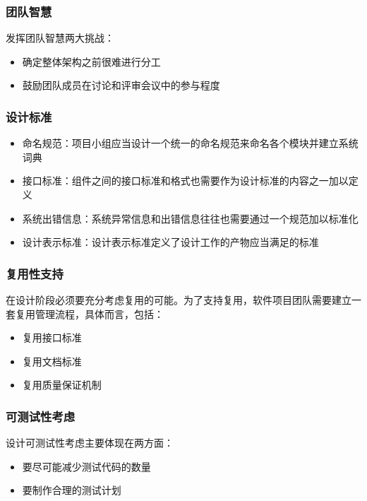 \subsubsection{团队智慧}
发挥团队智慧两大挑战：
\vspace{-0.8em}
\begin{multicols}{2}
    \begin{itemize}
        \item 确定整体架构之前很难进行分工
        \item 鼓励团队成员在讨论和评审会议中的参与程度
    \end{itemize}
\end{multicols}
\vspace{-1em}

\subsubsection{设计标准}
\begin{itemize}
    \item 命名规范：项目小组应当设计一个统一的命名规范来命名各个模块并建立系统词典
    \item 接口标准：组件之间的接口标准和格式也需要作为设计标准的内容之一加以定义
    \item 系统出错信息：系统异常信息和出错信息往往也需要通过一个规范加以标准化
    \item 设计表示标准：设计表示标准定义了设计工作的产物应当满足的标准
\end{itemize}

\subsubsection{复用性支持}
在设计阶段必须要充分考虑复用的可能。为了支持复用，软件项目团队需要建立一套复用管理流程，具体而言，包括：
\vspace{-0.8em}
\begin{multicols}{3}
    \begin{itemize}
        \item 复用接口标准
        \item 复用文档标准
        \item 复用质量保证机制
    \end{itemize}
\end{multicols}
\vspace{-1em}

\subsubsection{可测试性考虑}
设计可测试性考虑主要体现在两方面：
\vspace{-0.8em}
\begin{multicols}{2}
    \begin{itemize}
        \item 要尽可能减少测试代码的数量
        \item 要制作合理的测试计划
    \end{itemize}
\end{multicols}
\vspace{-1em}

